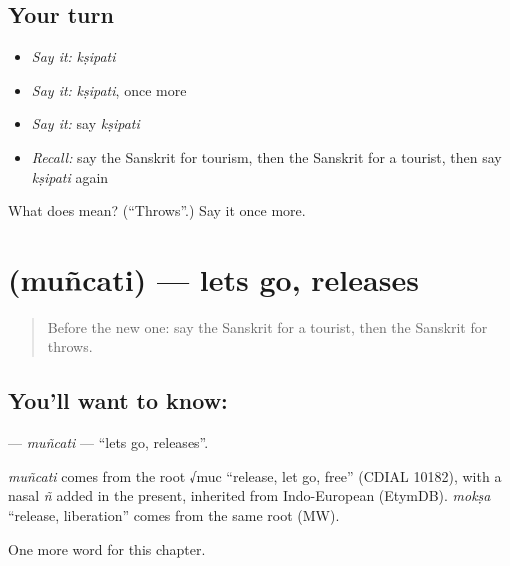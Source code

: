\subsection*{Your turn}
\begin{itemize}
\raggedright
  \item \emph{Say it:} \emph{kṣipati}
  \item \emph{Say it:} \emph{kṣipati}, once more
  \item \emph{Say it:} say \emph{kṣipati}
  \item \emph{Recall:} say the Sanskrit for tourism, then the Sanskrit for a tourist, then say \emph{kṣipati} again
\end{itemize}

\begin{tcolorbox}[breakable,colback=teal!4,colframe=teal!35!black,title={Before you move on}]
What does  mean? (\textquotedblleft{}Throws\textquotedblright{}.) Say it once more.
\end{tcolorbox}
\section[\texorpdfstring{\sk{मुञ्चति} (muñcati)}{मुञ्चति (muñcati)}]{ (muñcati) — lets go, releases}

\label{lesson:SA-C173-muncati}



\begin{quote}
Before the new one: say the Sanskrit for a tourist, then the Sanskrit for throws.
\end{quote}

\subsection*{You'll want to know: }
\textbf{} — \emph{muñcati} — \textquotedblleft{}lets go, releases\textquotedblright{}.

\begin{cousinweb}
\emph{muñcati} comes from the root √muc \textquotedblleft{}release, let go, free\textquotedblright{} (CDIAL 10182), with a nasal \emph{ñ} added in the present, inherited from Indo-European (EtymDB). \emph{mokṣa} \textquotedblleft{}release, liberation\textquotedblright{} comes from the same root (MW).
\end{cousinweb}

\begin{grammarlens}[title={What you've built}]
One more word for this chapter.
\end{grammarlens}

